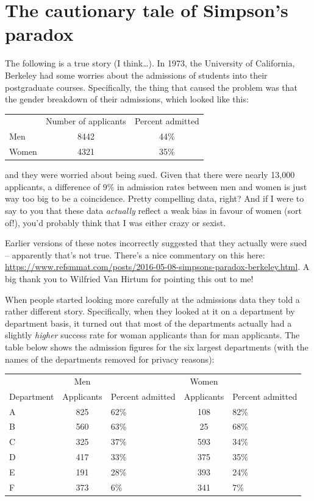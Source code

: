\documentclass[
]{book}
\begin{document}
\section{The cautionary tale of Simpson's paradox}\label{the-cautionary-tale-of-simpsons-paradox}

The following is a true story (I think\ldots). In 1973, the University of California, Berkeley had some worries about the admissions of students into their postgraduate courses. Specifically, the thing that caused the problem was that the gender breakdown of their admissions, which looked like this:

\begin{longtable}[]{@{}lcc@{}}
\toprule\noalign{}
\endhead
\bottomrule\noalign{}
\endlastfoot
& Number of applicants & Percent admitted \\
Men & 8442 & 44\% \\
Women & 4321 & 35\% \\
\end{longtable}

and they were worried about being sued. Given that there were nearly 13,000 applicants, a difference of 9\% in admission rates between men and women is just way too big to be a coincidence. Pretty compelling data, right? And if I were to say to you that these data \emph{actually} reflect a weak bias in favour of women (sort of!), you'd probably think that I was either crazy or sexist.

Earlier versions of these notes incorrectly suggested that they actually were sued -- apparently that's not true. There's a nice commentary on this here: \url{https://www.refsmmat.com/posts/2016-05-08-simpsons-paradox-berkeley.html}. A big thank you to Wilfried Van Hirtum for pointing this out to me!

When people started looking more carefully at the admissions data \citep{Bickel1975} they told a rather different story. Specifically, when they looked at it on a department by department basis, it turned out that most of the departments actually had a slightly \emph{higher} success rate for woman applicants than for man applicants. The table below shows the admission figures for the six largest departments (with the names of the departments removed for privacy reasons):

\begin{longtable}[]{@{}lclcl@{}}
\toprule\noalign{}
\endhead
\bottomrule\noalign{}
\endlastfoot
& Men & & Women & \\
Department & Applicants & Percent admitted & Applicants & Percent admitted \\
A & 825 & 62\% & 108 & 82\% \\
B & 560 & 63\% & 25 & 68\% \\
C & 325 & 37\% & 593 & 34\% \\
D & 417 & 33\% & 375 & 35\% \\
E & 191 & 28\% & 393 & 24\% \\
F & 373 & 6\% & 341 & 7\% \\
\end{longtable}
\end{document}
